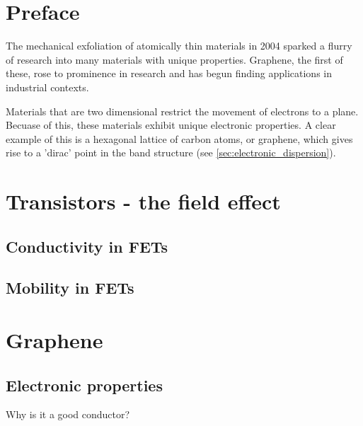 \documentclass[../Matt_Gebert_Honours_Thesis.tex]{subfiles}
\begin{document}
	

	\section{Preface}
	
	The mechanical exfoliation of atomically thin materials in 2004 sparked a flurry of research into many materials with unique properties. Graphene, the first of these, rose to prominence in research and has begun finding applications in industrial contexts. 
	
	Materials that are two dimensional restrict the movement of electrons to a plane. Becuase of this, these materials exhibit unique electronic properties. A clear example of this is a hexagonal lattice of carbon atoms, or graphene, which gives rise to a 'dirac' point in the band structure (see \cref{sec:electronic_dispersion}).
	
	\section{Transistors - the field effect}\label{sec:fet}
	\subsection{Conductivity in FETs}\label{sec:fet_cond}
	
	\subsection{Mobility in FETs}\label{sec:fet_mobil}
	
	\section{Graphene}\label{sec:graphene}
	\subsection{Electronic properties}\label{sec:electronic_properties}
	Why is it a good conductor?
\end{document}
